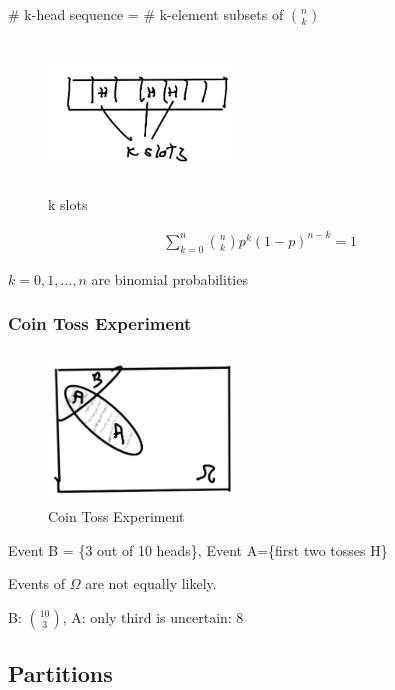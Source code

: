 
\# k-head sequence = \# k-element subsets of ${n \choose k}$

\begin{figure}[h]
\centering
\includegraphics[width=5cm, height=4cm]{images/L04/k_slots.jpeg}
\caption{k slots}
\end{figure}

\begin{align}
\sum_{k=0}^{n} {n \choose k} p^k(1-p)^{n-k}=1  
\label{eq:binomial_pmf}
\end{align}


$k=0,1,\ldots,n$ are binomial probabilities

\subsubsection{Coin Toss Experiment}

\begin{figure}[h]
\centering
\includegraphics[width=5cm, height=4cm]{images/L04/coin_toss_exp.jpeg}
\caption{Coin Toss Experiment}
\end{figure}

Event B = \{3 out of 10 heads\}, Event A=\{first two tosses H\}

Events of $\Omega$ are not equally likely.

B: ${10 \choose 3}$, A: only third is uncertain: 8

\subsection{Partitions}

